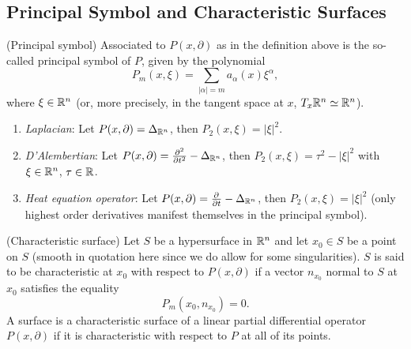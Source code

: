 \documentclass[11pt]{article}
\begin{document}
			
			\subsection{Principal Symbol and Characteristic Surfaces}

				\begin{defi}
					(Principal symbol) Associated to $P(x,\partial)$ as in the definition above is the so-called principal symbol of $P$, given by the polynomial 
					\begin{equation*}
						P_m(x,\xi)=\sum_{|\alpha|=m}a_\alpha(x)\xi^\alpha,
					\end{equation*}
					where $\xi\in\R^n$ (or, more precisely, in the tangent space at $x$, $T_x\R^n\simeq\R^n$).
				\end{defi}

				\begin{eg}
					\begin{enumerate}
						\item \textit{Laplacian}: Let $P(x,\partial)=\Delta_{\R^n}$, then $P_2(x,\xi)=|\xi|^2$.
						\item \textit{D'Alembertian}: Let $P(x,\partial)=\del[2]{}{t^2}-\Delta_{\R^n}$, then $P_2(x,\xi)=\tau^2-|\xi|^2$ with $\xi\in\R^n$, $\tau\in\R$. 
						\item \textit{Heat equation operator}: Let $P(x,\partial)=\del[]{}{t}-\Delta_{\R^n}$, then $P_2(x,\xi)=|\xi|^2$ (only highest order derivatives manifest themselves in the principal symbol).
					\end{enumerate}
				\end{eg}

				\begin{defi} (Characteristic surface)
					Let $S$ be a  hypersurface in $\R^n$ and let $x_0\in S$ be a point on $S$ (smooth in quotation here since we do allow for some singularities). $S$ is said to be characteristic at $x_0$ with respect to $P(x,\partial)$ if a vector $n_{x_0}$ normal to $S$ at $x_0$ satisfies the equality
					\begin{equation*}
						P_m(x_0,n_{x_0})=0.
					\end{equation*}
					A surface is a characteristic surface of a linear partial differential operator $P(x,\partial)$ if it is characteristic with respect to $P$ at all of its points.
				\end{defi}
\end{document}
